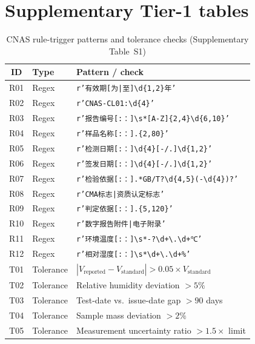 \section{Supplementary Tier-1 tables}
\label{app:supp_tables}

\begin{table}[t]
\centering
\caption{CNAS rule-trigger patterns and tolerance checks (Supplementary Table~S1)}
\label{tab:cnas_rules_s1}
\footnotesize
\begin{tabular}{@{}clp{5.8cm}@{}}
\toprule
ID & Type & Pattern / check \\
\midrule
R01 & Regex & \texttt{r'有效期[为|至]\textbackslash d\{1,2\}年'} \\
R02 & Regex & \texttt{r'CNAS-CL01:\textbackslash d\{4\}'} \\
R03 & Regex & \texttt{r'报告编号[:：]\textbackslash s*[A-Z]\{2,4\}\textbackslash d\{6,10\}'} \\
R04 & Regex & \texttt{r'样品名称[:：].\{2,80\}'} \\
R05 & Regex & \texttt{r'检测日期[:：]\textbackslash d\{4\}[-/.]\textbackslash d\{1,2\}'} \\
R06 & Regex & \texttt{r'签发日期[:：]\textbackslash d\{4\}[-/.]\textbackslash d\{1,2\}'} \\
R07 & Regex & \texttt{r'检验依据[:：].*GB/T?\textbackslash d\{4,5\}(-\textbackslash d\{4\})?'} \\
R08 & Regex & \texttt{r'CMA标志|资质认定标志'} \\
R09 & Regex & \texttt{r'判定依据[:：].\{5,120\}'} \\
R10 & Regex & \texttt{r'数字报告附件|电子附录'} \\
R11 & Regex & \texttt{r'环境温度[:：]\textbackslash s*-?\textbackslash d+\textbackslash.\textbackslash d+℃'} \\
R12 & Regex & \texttt{r'相对湿度[:：]\textbackslash s*\textbackslash d+\textbackslash.\textbackslash d+\%'} \\
\midrule
T01 & Tolerance & $|V_{\mathrm{reported}} - V_{\mathrm{standard}}| > 0.05 \times V_{\mathrm{standard}}$ \\
T02 & Tolerance & Relative humidity deviation $> 5\%$ \\
T03 & Tolerance & Test-date vs.\ issue-date gap $> 90$ days \\
T04 & Tolerance & Sample mass deviation $> 2\%$ \\
T05 & Tolerance & Measurement uncertainty ratio $> 1.5 \times$ limit \\
\bottomrule
\end{tabular}
\end{table}

